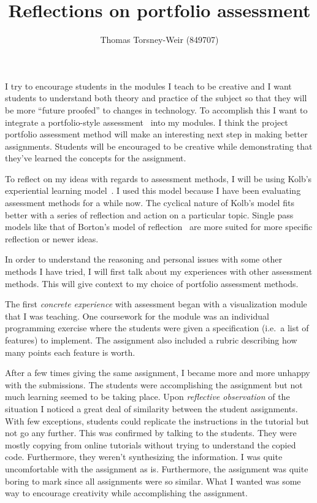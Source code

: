 \documentclass[
]{article}
\title{Reflections on portfolio assessment}
\author{Thomas Torsney-Weir (849707)}
\date{}
\begin{document}
\maketitle

I try to encourage students in the modules I teach to be creative and I
want students to understand both theory and practice of the subject so
that they will be more ``future proofed'' to changes in technology. To
accomplish this I want to integrate a portfolio-style
assessment~\cite{koretz:1994} into my modules. I think the project portfolio
assessment method will make an interesting next step in making better
assignments. Students will be encouraged to be creative while
demonstrating that they've learned the concepts for the assignment.

To reflect on my ideas with regards to assessment methods, I will be using
Kolb's experiential learning model~\cite{kolb:2014}. I used this model because
I have been evaluating assessment methods for a while now. The cyclical nature
of Kolb's model fits better with a series of reflection and action on a
particular topic. Single pass models like that of Borton's model of
reflection~\cite{borton:1970} are more suited for more specific reflection or
newer ideas.

In order to understand the reasoning and personal issues with some other
methods I have tried, I will first talk about my experiences with other
assessment methods. This will give context to my choice of portfolio
assessment methods.

The first \emph{concrete experience} with assessment began with a
visualization module that I was teaching. One coursework for the module
was an individual programming exercise where the students were given a
specification (i.e.~a list of features) to implement. The assignment
also included a rubric describing how many points each feature is worth.

After a few times giving the same assignment, I became more and more
unhappy with the submissions. The students were accomplishing the
assignment but not much learning seemed to be taking place. Upon
\emph{reflective observation} of the situation I noticed a great deal of
similarity between the student assignments. With few exceptions,
students could replicate the instructions in the tutorial but not go any
further. This was confirmed by talking to the students. They were mostly
copying from online tutorials without trying to understand the copied
code. Furthermore, they weren't synthesizing the information. I was
quite uncomfortable with the assignment as is. Furthermore, the
assignment was quite boring to mark since all assignments were so
similar. What I wanted was some way to encourage creativity while
accomplishing the assignment.
\end{document}
